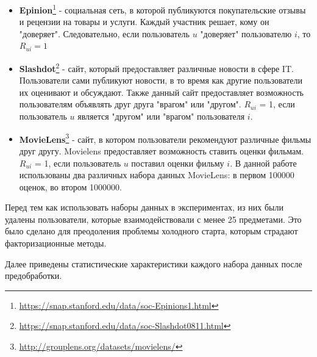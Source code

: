 \documentclass[14pt]{extarticle}
\begin{document}
\begin{itemize}
\item \textbf{Epinion}\footnote{\url{https://snap.stanford.edu/data/soc-Epinions1.html}} - социальная сеть, в которой публикуются покупательские отзывы и рецензии на товары и услуги. Каждый участник  решает, кому он "доверяет". Следовательно, если пользователь $u$ "доверяет" пользователю $i$, то $R_{ui} = 1$

\item \textbf{Slashdot}\footnote{\url{https://snap.stanford.edu/data/soc-Slashdot0811.html}} - сайт, который предоставляет различные новости в сфере IT. Пользователи сами публикуют новости, в то время как другие пользователи их оценивают и обсуждают. Также данный сайт предоставляет возможность пользователям объявлять друг друга "врагом" или "другом".  $R_{ui}$ = 1, если пользователь $u$ является "другом" или "врагом" пользователя $i$.

\item \textbf{MovieLens}\footnote{\url{http://grouplens.org/datasets/movielens/}} - сайт, в котором пользователи рекомендуют различные фильмы друг другу. Movielens предоставляет возможность ставить оценки фильмам. $R_{ui}$ = 1, если пользователь $u$ поставил оценки фильму $i$. В данной работе использованы два различных набора данных MovieLens: в первом 100000 оценок, во втором 1000000.

\end{itemize}

Перед тем как использовать наборы данных в экспериментах, из них были удалены пользователи, которые взаимодействовали с менее  25 предметами. Это было сделано для преодоления проблемы холодного старта, которым страдают факторизационные методы. 

Далее приведены статистические характеристики каждого набора данных после предобработки. 



\begin{table}[H]
\caption{\label{tab:canonsummary}Статистические характеристики}
\end{table} 
\end{document}
